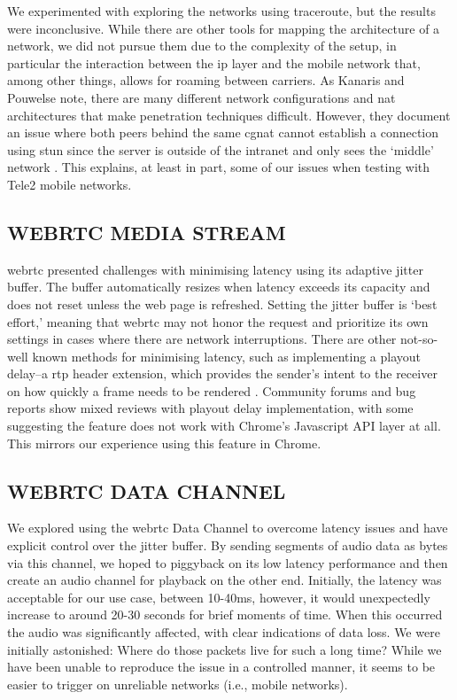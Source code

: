 \documentclass[fleqn]{jaes}
\begin{document}
We experimented with exploring the networks using traceroute, but the results were inconclusive. While there are other tools for mapping the architecture of a network, we did not pursue them due to the complexity of the setup, in particular the interaction between the \gls{ip} layer and the mobile network that, among other things, allows for roaming between carriers. As Kanaris and Pouwelse note, there are many different network configurations and \gls{nat} architectures that make penetration techniques difficult. However, they document an issue where both peers behind the same \gls{cgnat} cannot establish a connection using \gls{stun} since the server is outside of the intranet and only sees the `middle' network \cite{kanaris2023mass}. This explains, at least in part, some of our issues when testing with Tele2 mobile networks.

\subsection{WEBRTC MEDIA STREAM}
\gls{webrtc} presented challenges with minimising latency using its adaptive jitter buffer. The buffer automatically resizes when latency exceeds its capacity and does not reset unless the web page is refreshed. Setting the jitter buffer is `best effort,' meaning that \gls{webrtc} may not honor the request and prioritize its own settings in cases where there are network interruptions. There are other not-so-well known methods for minimising latency, such as implementing a playout delay--a \gls{rtp} header extension, which provides the sender’s intent to the receiver on how quickly a frame needs to be rendered \cite{schulzrinne2003rfc3550}. Community forums and bug reports show mixed reviews with playout delay implementation, with some suggesting the feature does not work with Chrome’s Javascript API layer at all. This mirrors our experience using this feature in Chrome.

\subsection{WEBRTC DATA CHANNEL}
We explored using the \gls{webrtc} Data Channel to overcome latency issues and have explicit control over the jitter buffer. By sending segments of audio data as bytes via this channel, we hoped to piggyback on its low latency performance and then create an audio channel for playback on the other end. Initially, the latency was acceptable for our use case, between 10-40ms, however, it would unexpectedly increase to around 20-30 seconds for brief moments of time. When this occurred the audio was significantly affected, with clear indications of data loss. We were initially astonished: Where do those packets live for such a long time? While we have been unable to reproduce the issue in a controlled manner, it seems to be easier to trigger on unreliable networks (i.e., mobile networks).
\end{document}
